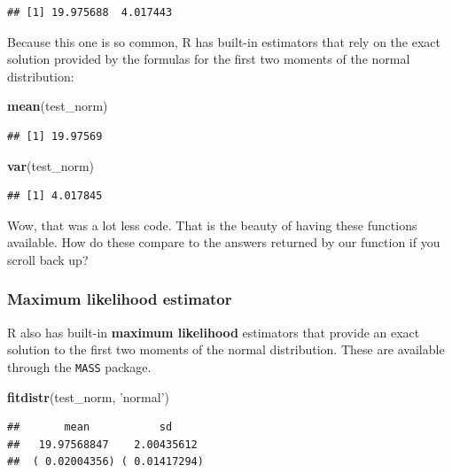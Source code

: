 \documentclass[
]{book}
\newenvironment{Shaded}{\begin{snugshade}}{\end{snugshade}}
\newcommand{\KeywordTok}[1]{\textcolor[rgb]{0.13,0.29,0.53}{\textbf{#1}}}
\newcommand{\NormalTok}[1]{#1}
\newcommand{\StringTok}[1]{\textcolor[rgb]{0.31,0.60,0.02}{#1}}
\begin{document}
\begin{verbatim}
## [1] 19.975688  4.017443
\end{verbatim}

Because this one is so common, R has built-in estimators that rely on
the exact solution provided by the formulas for the first two moments
of the normal distribution:

\begin{Shaded}
\begin{Highlighting}[]
\KeywordTok{mean}\NormalTok{(test_norm)}
\end{Highlighting}
\end{Shaded}

\begin{verbatim}
## [1] 19.97569
\end{verbatim}

\begin{Shaded}
\begin{Highlighting}[]
\KeywordTok{var}\NormalTok{(test_norm)}
\end{Highlighting}
\end{Shaded}

\begin{verbatim}
## [1] 4.017845
\end{verbatim}

Wow, that was a lot less code. That is the beauty of having these functions available. How do these compare to the answers returned by our function if you scroll back up?

\hypertarget{maximum-likelihood-estimator}{%
\subsubsection{Maximum likelihood estimator}\label{maximum-likelihood-estimator}}

R also has built-in \textbf{maximum likelihood} estimators that provide an exact solution to the first two moments of the normal distribution. These are available through the \texttt{MASS} package.

\begin{Shaded}
\begin{Highlighting}[]
\KeywordTok{fitdistr}\NormalTok{(test_norm, }\StringTok{'normal'}\NormalTok{)}
\end{Highlighting}
\end{Shaded}

\begin{verbatim}
##       mean           sd     
##   19.97568847    2.00435612 
##  ( 0.02004356) ( 0.01417294)
\end{verbatim}
\end{document}

